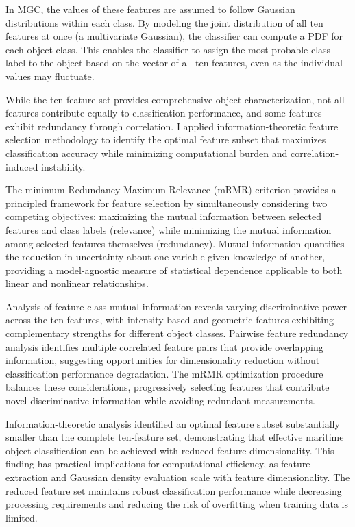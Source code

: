 \documentclass{erauthesis}
\begin{document}
In \ac{MGC}, the values of these features are assumed to follow Gaussian distributions within each class.
By modeling the joint distribution of all ten features at once (a multivariate Gaussian), the classifier can compute a \acl{PDF} for each object class.
This enables the classifier to assign the most probable class label to the object based on the vector of all ten features, even as the individual values may fluctuate.


While the ten-feature set provides comprehensive object characterization, not all features contribute equally to classification performance, and some features exhibit redundancy through correlation.
I applied information-theoretic feature selection methodology to identify the optimal feature subset that maximizes classification accuracy while minimizing computational burden and correlation-induced instability.

The minimum Redundancy Maximum Relevance (mRMR) criterion provides a principled framework for feature selection by simultaneously considering two competing objectives: maximizing the mutual information between selected features and class labels (relevance) while minimizing the mutual information among selected features themselves (redundancy).
Mutual information quantifies the reduction in uncertainty about one variable given knowledge of another, providing a model-agnostic measure of statistical dependence applicable to both linear and nonlinear relationships.

Analysis of feature-class mutual information reveals varying discriminative power across the ten features, with intensity-based and geometric features exhibiting complementary strengths for different object classes.
Pairwise feature redundancy analysis identifies multiple correlated feature pairs that provide overlapping information, suggesting opportunities for dimensionality reduction without classification performance degradation.
The mRMR optimization procedure balances these considerations, progressively selecting features that contribute novel discriminative information while avoiding redundant measurements.

Information-theoretic analysis identified an optimal feature subset substantially smaller than the complete ten-feature set, demonstrating that effective maritime object classification can be achieved with reduced feature dimensionality.
This finding has practical implications for computational efficiency, as feature extraction and Gaussian density evaluation scale with feature dimensionality.
The reduced feature set maintains robust classification performance while decreasing processing requirements and reducing the risk of overfitting when training data is limited.
\end{document}
